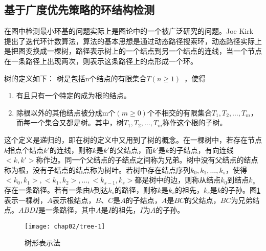 \subsection{基于广度优先策略的环结构检测}
\label{}


在图中检测最小环基的问题实际上是图论中的一个被广泛研究的问题。Joe Kirk 提出了迭代环计数算法，算法的基本思想是通过动态路径搜索环，动态路径实际上是把图变换成一棵树，路径表示树上的一个结点到另一个结点的连线，当一个节点在一条路径上出现两次，则表示这条路径上的点形成一个环。

树的定义如下：
树是包括n个结点的有限集合$T(n \geq 1)$~\cite{zhangming}，使得
\begin{enumerate}
\item 有且只有一个特定的成为根的结点。
\item 除根以外的其他结点被分成m个$(m \geq 0)$个不相交的有限集合$T_1, T_2, \ldots, T_m$，而每一个集合又都是树。其中，树$T_1, T_2, \ldots, T_m$称作这个根的子树。
\end{enumerate}

这个定义是递归的，即在树的定义中又用到了树的概念。在一棵树中，若存在节点$k$指点个结点$k'$的连线，则称$k$是$k'$的父结点，而$k'$是$k$的子结点，有向连线$<k, k'>$称作边。同一个父结点的子结点之间称为兄弟。树中没有父结点的结点称为根，没有子结点的结点称为树叶。若树中存在结点序列$k_0,k_1,\ldots,k_s$，使得$<k_0,k_1>,<k_1,k_2>,\ldots,<k_{s-1},k_s>$都是树中的边，则称从结点$k_0$到结点$k_s$存在一条路径。若有一条由$k$到达$k_s$的路径，则称$k$是$k_s$的祖先，$k_s$是$k$的子孙。图\ref{fig:tree}表示一棵树，$A$表示根结点，$B$、$C$是$A$的子结点，$A$是$BC$的父结点，$BC$为兄弟结点。$ABDI$是一条路径，其中$A$是$I$的祖先，$I$为$A$的子孙。

\begin{figure}
\centering
\texttt{[image: chap02/tree-1]}
\caption{树形表示法}
\label{fig:tree}
\end{figure}

